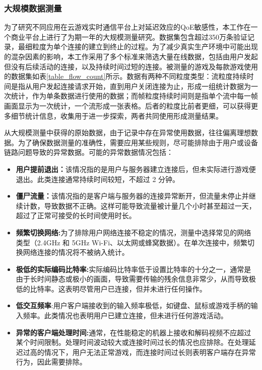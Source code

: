 \subsubsection{大规模数据测量}
为了研究不同应用在云游戏实时通信平台上对延迟效应的QoE敏感性，本工作在一个商业平台上进行了为期一年的大规模测量研究。数据集包含超过350万条验证记录，最细粒度为单个连接的建立到终止的过程。为了减少真实生产环境中可能出现的混杂因素的影响，本工作采用了多个标准来筛选大量在线数据，包括由用户发起但没有后续活动的连接，以及持续时间过短的连接。被测量的游戏及每款游戏使用的数据集如表\ref{table_flow_count}所示。数据有两种不同粒度类型：流粒度持续时间是指从用户发起连接请求开始，直到用户关闭连接为止，形成一组统计数据为一次统计，作为单条数据进行使用的数据；而帧粒度持续时间则是指单个流中每一帧画面显示为一次统计，一个流形成一张表格。后者的粒度比前者更细，可以获得更多细节统计信息，收集用于进一步探索，两者共同使用形成测量结果。




从大规模测量中获得的原始数据，由于记录中存在异常使用数据，往往偏离理想数据。为了确保数据测量的准确性，需要应用某些规则，尽可能排除由于用户或设备链路问题导致的异常数据。可能的异常数据情况包括：
\begin{itemize} 
\item \textbf{用户提前退出：}该情况指的是用户与服务器建立连接后，但未实际进行游戏便退出。此类连接通常持续时间较短，不超过 2 分钟。 

\item \textbf{僵尸流量：}该情况指的是客户端与服务器的连接异常断开，但流量未停止并继续计数，导致数据不正确。这样可能导致流量被计量几个小时甚至超过一天，超过了正常可接受的长时间使用时长。 

\item \textbf{频繁切换网络:}为了排除用户网络连接不稳定的情况，测量中选择常见的网络类型（2.4GHz 和 5GHz Wi-Fi、以太网或蜂窝数据）。在单次连接中，频繁切换网络连接的情况将不被纳入统计。 

\item \textbf{极低的实际编码比特率:}实际编码比特率低于设置比特率的十分之一，通常是由于长时间静态或极小的画面，导致需要传输的残余信息非常少，从而导致极低的比特率。这表明尽管用户已连接，但并未进行任何操作。 

\item \textbf{低交互频率}:用户客户端接收到的输入频率极低，如键盘、鼠标或游戏手柄的输入频率。此类情况也表明用户已建立连接，但未进行任何游戏活动。 

\item \textbf{异常的客户端处理时间:}通常，在性能稳定的机器上接收和解码视频不应超过某个时间限制。处理时间波动较大或连接时间过长的情况也应排除。在处理延迟过高的情况下，用户无法正常游戏，而连接时间过长则表明客户端存在异常行为，因此需要排除。 

\end{itemize}

